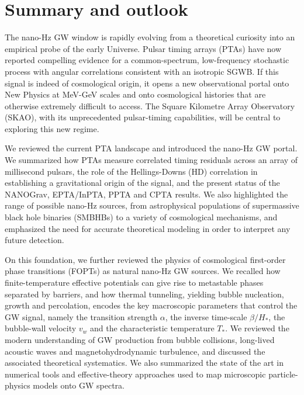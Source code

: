 \documentclass[a4paper,11pt]{article}
\begin{document}
\section{Summary and outlook}
\label{sec:summary}

The nano-Hz GW window is rapidly evolving from a theoretical curiosity into an empirical probe of the early Universe. 
Pulsar timing arrays (PTAs) have now reported compelling evidence for a common-spectrum, low-frequency stochastic process 
with angular correlations consistent with an isotropic SGWB. If this signal is indeed of cosmological origin, it opens 
a new observational portal onto New Physics at MeV-GeV scales and onto cosmological histories that are otherwise extremely
difficult to access. The Square Kilometre Array Observatory (SKAO), with its unprecedented pulsar-timing capabilities, 
will be central to exploring this new regime.

We reviewed the current PTA landscape and introduced the nano-Hz GW portal. We summarized how PTAs measure correlated 
timing residuals across an array of millisecond pulsars, the role of the Hellings-Downs (HD) correlation in establishing 
a gravitational origin of the signal, and the present status of the NANOGrav, EPTA/InPTA, PPTA and CPTA results. We also
highlighted the range of possible nano-Hz sources, from astrophysical populations of supermassive black hole binaries 
(SMBHBs) to a variety of cosmological mechanisms, and emphasized the need for accurate theoretical modeling in order 
to interpret any future detection.

On this foundation, we further reviewed the physics of cosmological first-order phase transitions (FOPTs) as natural 
nano-Hz GW sources. We recalled how finite-temperature effective potentials can give rise to metastable phases separated 
by barriers, and how thermal tunneling, yielding bubble nucleation, growth and percolation, encodes the key macroscopic
parameters that control the GW signal, namely the transition strength $\alpha$, the inverse time-scale $\beta/H_*$, 
the bubble-wall velocity $v_w$ and the characteristic temperature $T_*$. We reviewed the modern understanding of 
GW production from bubble collisions, long-lived acoustic waves and magnetohydrodynamic turbulence, and discussed 
the associated theoretical systematics. We also summarized the state of the art in numerical tools and effective-theory
approaches used to map microscopic particle-physics models onto GW spectra.
\end{document}
